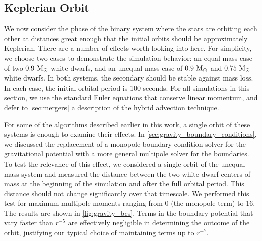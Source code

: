 \documentclass[12pt]{article}
\begin{document}
\subsection{Keplerian Orbit}
\label{sec:kepler}

We now consider the phase of the binary system where the stars are orbiting each other 
at distances great enough that the initial orbits should be approximately Keplerian. 
There are a number of effects worth looking into here. For simplicity, we choose two 
cases to demonstrate the simulation behavior: an equal mass case of two $0.9\ \mathrm{M}_\odot$ 
white dwarfs, and an unequal mass case of $0.9\ \mathrm{M}_\odot$ and $0.75\ \mathrm{M}_\odot$ white dwarfs.
In both systems, the secondary should be stable against mass loss.
In each case, the initial orbital period is 100 seconds. For all simulations in this section,
we use the standard Euler equations that conserve linear momentum, and defer to \autoref{sec:mergers}
a description of the hybrid advection technique.

For some of the algorithms described earlier in this work, a single orbit of these 
systems is enough to examine their effects. In \autoref{sec:gravity_boundary_conditions},
we discussed the replacement of a monopole boundary condition solver for the gravitational 
potential with a more general multipole solver for the boundaries. To test the relevance 
of this effect, we considered a single orbit of the unequal mass system and measured 
the distance between the two white dwarf centers of mass at the beginning of the simulation and after 
the full orbital period. This distance should not change significantly over that timescale.
We performed this test for maximum multipole moments ranging from 0 (the monopole term) to 16.
The results are shown in \autoref{fig:gravity_bcs}. Terms in the boundary potential 
that vary faster than $r^{-5}$ are effectively negligible in determining the outcome of the orbit, 
justifying our typical choice of maintaining terms up to $r^{-7}$.
\end{document}
